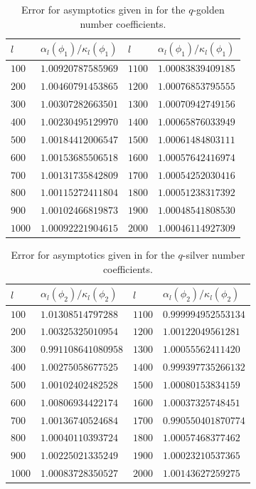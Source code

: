 \documentclass[11pt,reqno]{amsart}
\theoremstyle{plain}
\theoremstyle{definition}
\numberwithin{figure}{section}
\numberwithin{table}{section}
\numberwithin{equation}{section}
\newcommand\al{\alpha}
\newcommand\ka{\kappa}
\begin{document}
\begin{table}[ht!]
\caption{\small Error for asymptotics given in  for the $q$-golden number coefficients.}
\begin{tabular}{|l|l||l|l|} \hline
$l$ & $\al_l(\phi_1)/\ka_l(\phi_1)$ & $l$ & $\al_l(\phi_1)/\ka_l(\phi_1)$ \\ \hline
$100$ & $1.00920787585969$ & $1100$ & $1.00083839409185$ \\ \hline
$200$ & $1.00460791453865$ & $1200$ & $1.00076853795555$ \\ \hline
$300$ & $1.00307282663501$ & $1300$ & $1.00070942749156$ \\ \hline
$400$ & $1.00230495129970$ & $1400$ & $1.00065876033949$ \\ \hline
$500$ & $1.00184412006547$ & $1500$ & $1.00061484803111$ \\ \hline
$600$ & $1.00153685506518$ & $1600$ & $1.00057642416974$ \\ \hline
$700$ & $1.00131735842809$ & $1700$ & $1.00054252030416$ \\ \hline
$800$ & $1.00115272411804$ & $1800$ & $1.00051238317392$ \\ \hline
$900$ & $1.00102466819873$ & $1900$ & $1.00048541808530$ \\ \hline
$1000$ & $1.00092221904615$ & $2000$ & $1.00046114927309$ \\ \hline
\end{tabular}
\end{table}

\begin{table}[ht!]
\caption{\small Error for asymptotics given in  for the $q$-silver number coefficients.}
\begin{tabular}{|l|l|l|l|} \hline
$l$ & $\al_l(\phi_2)/\ka_l(\phi_2)$ & $l$ & $\al_l(\phi_2)/\ka_l(\phi_2)$ \\ \hline
$100$ & $1.01308514797288$ & $1100$ & $0.999994952553134$ \\ \hline
$200$ & $1.00325325010954$ & $1200$ & $1.00122049561281$ \\ \hline
$300$ & $0.991108641080958$ & $1300$ & $1.00055562411420$ \\ \hline
$400$ & $1.00275058677525$ & $1400$ & $0.999397735266132$ \\ \hline
$500$ & $1.00102402482528$ & $1500$ & $1.00080153834159$ \\ \hline
$600$ & $1.00806934422174$ & $1600$ & $1.00037325748451$ \\ \hline
$700$ & $1.00136740524684$ & $1700$ & $0.990550401870774$ \\ \hline
$800$ & $1.00040110393724$ & $1800$ & $1.00057468377462$ \\ \hline
$900$ & $1.00225021335249$ & $1900$ & $1.00023210537365$ \\ \hline
$1000$ & $1.00083728350527$ & $2000$ & $1.00143627259275$ \\ \hline
\end{tabular}
\end{table}
\end{document}
